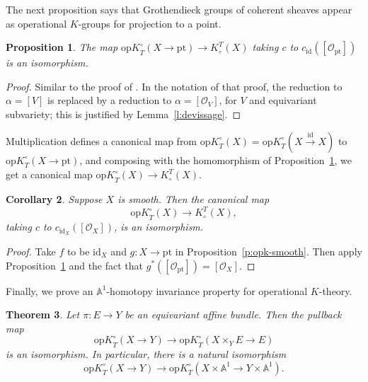 \documentclass[11pt]{amsart}
\newtheorem{theorem}{Theorem}[section]
\newtheorem{proposition}[theorem]{Proposition}
\newtheorem{corollary}[theorem]{Corollary}
\theoremstyle{definition}
\begin{document}
The next proposition says that Grothendieck groups of coherent sheaves appear as operational $K$-groups for projection to a point.

\begin{proposition} \label{p:smooth}
The map ${\mathrm{op}K}^\circ_T(X \rightarrow {\mathrm{pt}}) \rightarrow K_\circ^T(X)$ taking $c$ to $c_{\mathrm{id}}([{\mathcal{O}}_{\mathrm{pt}}])$ is an isomorphism.
\end{proposition}

\begin{proof}
Similar to the proof of \cite[Proposition~17.3.1]{it}.  In the notation of that proof, the reduction to $\alpha = [V]$ is replaced by a reduction to $\alpha = [{\mathcal{O}}_V]$, for $V$ and equivariant subvariety; this is justified by Lemma~\ref{l:devissage}.
\end{proof}

Multiplication defines a canonical map from ${\mathrm{op}K}_T^\circ(X) = {\mathrm{op}K}_T^\circ(X \xrightarrow{\mathrm{id}} X)$ to ${\mathrm{op}K}_T^\circ(X \to {\mathrm{pt}})$, and composing with the  homomorphism of Proposition~\ref{p:smooth}, we get a canonical map ${\mathrm{op}K}_T^\circ(X) \to K^T_\circ(X)$.

\begin{corollary}  \label{c:smooth}
Suppose $X$ is smooth.  Then the canonical map
\[
{\mathrm{op}K}^\circ_T(X) \rightarrow K_\circ^T(X),
\]
taking $c$ to $c_{{\mathrm{id}}_X}([{\mathcal{O}}_X])$, is an isomorphism.
\end{corollary}

\begin{proof}
Take $f$ to be ${\mathrm{id}}_X$ and $g\colon X \rightarrow {\mathrm{pt}}$ in Proposition~\ref{p:opk-smooth}.  Then apply Proposition~\ref{p:smooth} and the fact that $g^*([{\mathcal{O}}_{\mathrm{pt}}]) = [{\mathcal{O}}_X]$.
\end{proof}

\bigskip

Finally, we prove an ${\mathbb{A}}^1$-homotopy invariance property for operational $K$-theory.

\begin{theorem}\label{t:homotopy}
Let $\pi: E \rightarrow Y$ be an equivariant affine bundle.  Then the pullback map
\[
  {\mathrm{op}K}_T^\circ(X \to Y) \to {\mathrm{op}K}_T^\circ(X\times_Y E \to E)
\]
is an isomorphism.  In particular, there is a natural isomorphism
\[
{\mathrm{op}K}_T^\circ(X \to Y) \to {\mathrm{op}K}_T^\circ(X \times {\mathbb{A}}^1 \rightarrow Y \times {\mathbb{A}}^1).
\]
\end{theorem}
\end{document}
